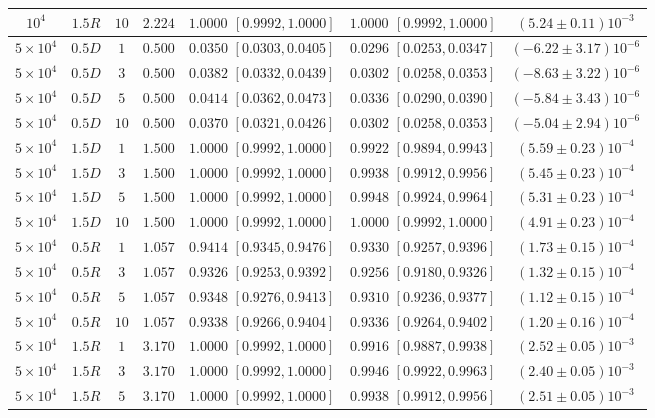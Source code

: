 \begin{table}[t]
\begin{tabular}{ccccccc}
$10^4$ & $1.5R$ & $10$ & $2.224$ & $1.0000$ $[0.9992,1.0000]$ & $1.0000$ $[0.9992,1.0000]$ & $(5.24\pm0.11)10^{-3}$\\
\midrule
$5{\times}10^4$ & $0.5D$ & $1$ & $0.500$ & $0.0350$ $[0.0303,0.0405]$ & $0.0296$ $[0.0253,0.0347]$ & $(-6.22\pm3.17)10^{-6}$\\
$5{\times}10^4$ & $0.5D$ & $3$ & $0.500$ & $0.0382$ $[0.0332,0.0439]$ & $0.0302$ $[0.0258,0.0353]$ & $(-8.63\pm3.22)10^{-6}$\\
$5{\times}10^4$ & $0.5D$ & $5$ & $0.500$ & $0.0414$ $[0.0362,0.0473]$ & $0.0336$ $[0.0290,0.0390]$ & $(-5.84\pm3.43)10^{-6}$\\
$5{\times}10^4$ & $0.5D$ & $10$ & $0.500$ & $0.0370$ $[0.0321,0.0426]$ & $0.0302$ $[0.0258,0.0353]$ & $(-5.04\pm2.94)10^{-6}$\\
$5{\times}10^4$ & $1.5D$ & $1$ & $1.500$ & $1.0000$ $[0.9992,1.0000]$ & $0.9922$ $[0.9894,0.9943]$ & $(5.59\pm0.23)10^{-4}$\\
$5{\times}10^4$ & $1.5D$ & $3$ & $1.500$ & $1.0000$ $[0.9992,1.0000]$ & $0.9938$ $[0.9912,0.9956]$ & $(5.45\pm0.23)10^{-4}$\\
$5{\times}10^4$ & $1.5D$ & $5$ & $1.500$ & $1.0000$ $[0.9992,1.0000]$ & $0.9948$ $[0.9924,0.9964]$ & $(5.31\pm0.23)10^{-4}$\\
$5{\times}10^4$ & $1.5D$ & $10$ & $1.500$ & $1.0000$ $[0.9992,1.0000]$ & $1.0000$ $[0.9992,1.0000]$ & $(4.91\pm0.23)10^{-4}$\\
$5{\times}10^4$ & $0.5R$ & $1$ & $1.057$ & $0.9414$ $[0.9345,0.9476]$ & $0.9330$ $[0.9257,0.9396]$ & $(1.73\pm0.15)10^{-4}$\\
$5{\times}10^4$ & $0.5R$ & $3$ & $1.057$ & $0.9326$ $[0.9253,0.9392]$ & $0.9256$ $[0.9180,0.9326]$ & $(1.32\pm0.15)10^{-4}$\\
$5{\times}10^4$ & $0.5R$ & $5$ & $1.057$ & $0.9348$ $[0.9276,0.9413]$ & $0.9310$ $[0.9236,0.9377]$ & $(1.12\pm0.15)10^{-4}$\\
$5{\times}10^4$ & $0.5R$ & $10$ & $1.057$ & $0.9338$ $[0.9266,0.9404]$ & $0.9336$ $[0.9264,0.9402]$ & $(1.20\pm0.16)10^{-4}$\\
$5{\times}10^4$ & $1.5R$ & $1$ & $3.170$ & $1.0000$ $[0.9992,1.0000]$ & $0.9916$ $[0.9887,0.9938]$ & $(2.52\pm0.05)10^{-3}$\\
$5{\times}10^4$ & $1.5R$ & $3$ & $3.170$ & $1.0000$ $[0.9992,1.0000]$ & $0.9946$ $[0.9922,0.9963]$ & $(2.40\pm0.05)10^{-3}$\\
$5{\times}10^4$ & $1.5R$ & $5$ & $3.170$ & $1.0000$ $[0.9992,1.0000]$ & $0.9938$ $[0.9912,0.9956]$ & $(2.51\pm0.05)10^{-3}$\\

\end{tabular}
\end{table}
